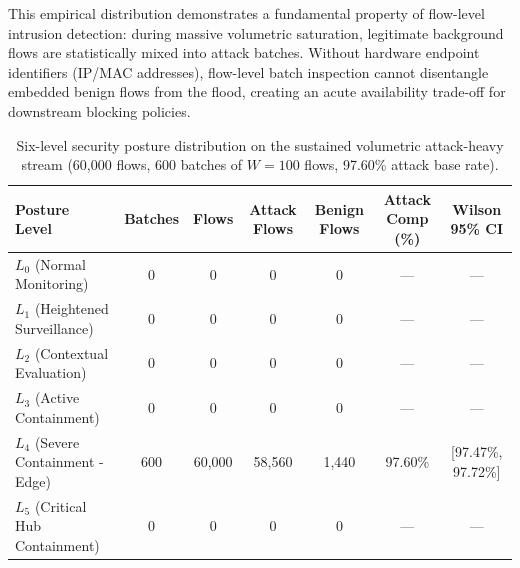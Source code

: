 \documentclass[journal,10pt,onecolumn]{IEEEtran}
\begin{document}
This empirical distribution demonstrates a fundamental property of flow-level intrusion detection: during massive volumetric saturation, legitimate background flows are statistically mixed into attack batches. Without hardware endpoint identifiers (IP/MAC addresses), flow-level batch inspection cannot disentangle embedded benign flows from the flood, creating an acute availability trade-off for downstream blocking policies.

\begin{table}[t]
\caption{Six-level security posture distribution on the sustained volumetric attack-heavy stream (60,000 flows, 600 batches of $W=100$ flows, 97.60\% attack base rate).}
\label{tab:posture_attack_heavy}
\centering
\small
\begin{tabular}{lcccccc}
\toprule
\textbf{Posture Level} & \textbf{Batches} & \textbf{Flows} & \textbf{Attack Flows} & \textbf{Benign Flows} & \textbf{Attack Comp (\%)} & \textbf{Wilson 95\% CI} \\
\midrule
$L_0$ (Normal Monitoring) & 0 & 0 & 0 & 0 & --- & --- \\
$L_1$ (Heightened Surveillance) & 0 & 0 & 0 & 0 & --- & --- \\
$L_2$ (Contextual Evaluation) & 0 & 0 & 0 & 0 & --- & --- \\
$L_3$ (Active Containment) & 0 & 0 & 0 & 0 & --- & --- \\
$L_4$ (Severe Containment - Edge) & 600 & 60,000 & 58,560 & 1,440 & 97.60\% & [97.47\%, 97.72\%] \\
$L_5$ (Critical Hub Containment) & 0 & 0 & 0 & 0 & --- & --- \\
\bottomrule
\end{tabular}
\end{table}
\end{document}
